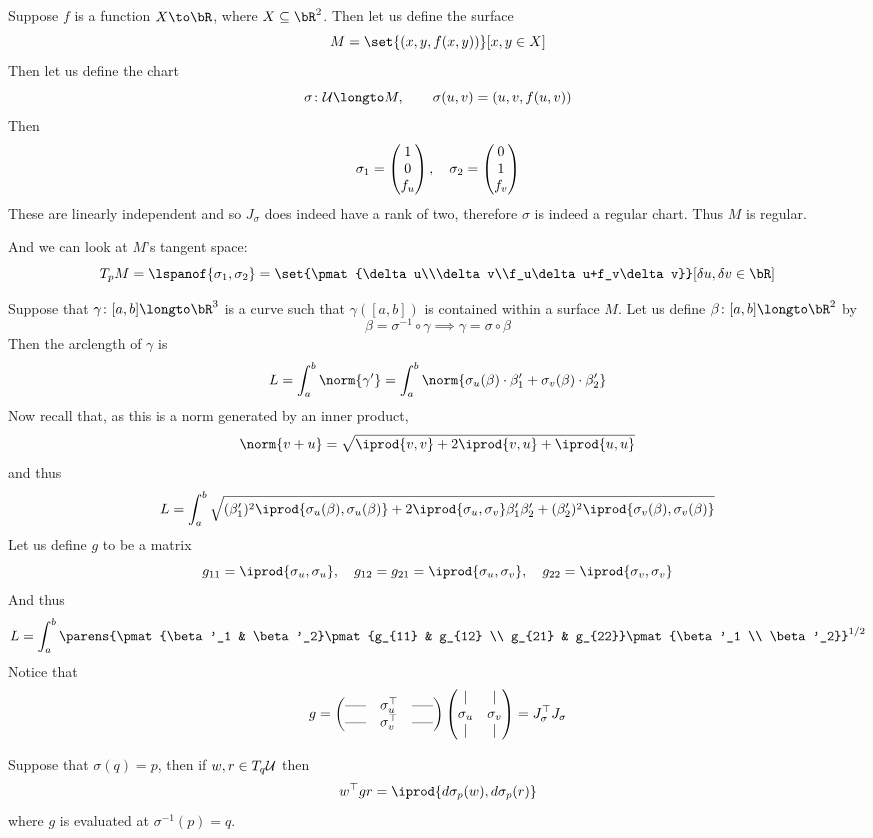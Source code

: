 \begin{exam*}

    Suppose $f$ is a function $X\to\bR$, where $X\subseteq\bR^2$.
    Then let us define the surface
    \[ M = \set{(x,y,f(x,y))}[x,y\in X] \]
    Then let us define the chart
    \[ \sigma\colon\mU\longto M,\qquad \sigma(u,v) = (u,v,f(u,v)) \]
    Then
    \[ \sigma_1 = \begin{pmatrix}1\\0\\f_u\end{pmatrix},\quad \sigma_2 = \begin{pmatrix}0\\1\\f_v\end{pmatrix} \]
    These are linearly independent and so $J_\sigma$ does indeed have a rank of two, therefore $\sigma$ is indeed a regular chart.
    Thus $M$ is regular.

    And we can look at $M$'s tangent space:
    \[ T_pM = \lspanof{\sigma_1,\sigma_2} = \set{\pmat{\delta u\\\delta v\\f_u\delta u+f_v\delta v}}[\delta u,\delta v\in\bR] \]

\end{exam*}

Suppose that $\gamma\colon[a,b]\longto\bR^3$ is a curve such that $\gamma([a,b])$ is contained within a surface $M$.
Let us define $\beta\colon[a,b]\longto\bR^2$ by
\[ \beta = \sigma^{-1}\circ\gamma \implies \gamma = \sigma\circ\beta \]
Then the arclength of $\gamma$ is
\[ L = \int_a^b \norm{\gamma'} = \int_a^b \norm{\sigma_u(\beta)\cdot\beta'_1 + \sigma_v(\beta)\cdot\beta'_2} \]
Now recall that, as this is a norm generated by an inner product,
\[ \norm{v+u} = \sqrt{\iprod{v,v} + 2\iprod{v,u} + \iprod{u,u}} \]
and thus
\[ L = \int_a^b\sqrt{(\beta'_1)^2\iprod{\sigma_u(\beta),\sigma_u(\beta)} + 2\iprod{\sigma_u,\sigma_v}\beta'_1\beta'_2 + (\beta'_2)^2\iprod{\sigma_v(\beta),\sigma_v(\beta)}} \]
Let us define $g$ to be a matrix
\[ g_{11} = \iprod{\sigma_u,\sigma_u},\quad g_{12} = g_{21} = \iprod{\sigma_u,\sigma_v},\quad g_{22} = \iprod{\sigma_v,\sigma_v} \]
And thus
\[ L = \int_a^b \parens{\pmat{\beta'_1 & \beta'_2}\pmat{g_{11} & g_{12} \\ g_{21} & g_{22}}\pmat{\beta'_1 \\ \beta'_2}}^{1/2} \]
Notice that
\[ g = \pmat{\hort & \sigma_u^\top & \hort \\ \hort & \sigma_v^\top & \hort}\pmat{\vert & \vert \\ \sigma_u & \sigma_v \\ \vert & \vert} = J_\sigma^\top J_\sigma \]

\begin{prop*}

    Suppose that $\sigma(q)=p$, then if $w,r\in T_q{\cal U}$ then
    \[ w^\top gr = \iprod{d\sigma_p(w),d\sigma_p(r)} \]
    where $g$ is evaluated at $\sigma^{-1}(p)=q$.

\end{prop*}

